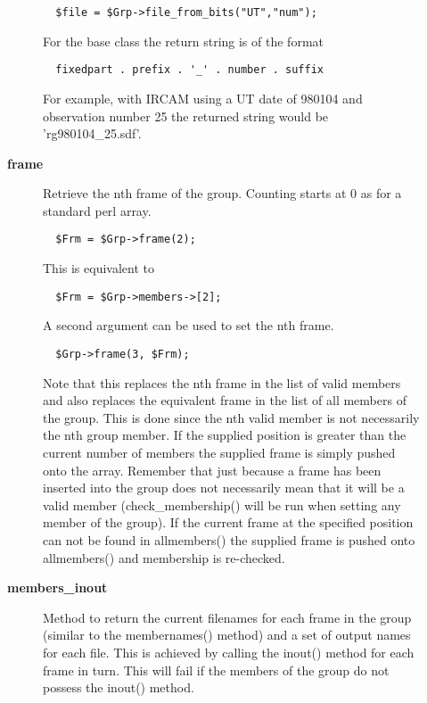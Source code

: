 \begin{description}
\begin{description}
\begin{verbatim}
  $file = $Grp->file_from_bits("UT","num");
\end{verbatim}


For the base class the return string is of the format

\begin{verbatim}
  fixedpart . prefix . '_' . number . suffix
\end{verbatim}


For example, with IRCAM using a UT date of 980104 and observation
number 25 the returned string would be 'rg980104\_25.sdf'.


\item[{\textbf{frame}}] \mbox{}

Retrieve the nth frame of the group.
Counting starts at 0 as for a standard perl array.

\begin{verbatim}
  $Frm = $Grp->frame(2);
\end{verbatim}


This is equivalent to

\begin{verbatim}
  $Frm = $Grp->members->[2];
\end{verbatim}


A second argument can be used to set the nth frame.

\begin{verbatim}
  $Grp->frame(3, $Frm);
\end{verbatim}


Note that this replaces the nth frame in the list of valid members and
also replaces the equivalent frame in the list of all members of the
group. This is done since the nth valid member is not necessarily the
nth group member. If the supplied position is greater than the current
number of members the supplied frame is simply pushed onto the
array. Remember that just because a frame has been inserted into the
group does not necessarily mean that it will be a valid member
(check\_membership() will be run when setting any member of the group).
If the current frame at the specified position can not be found in
allmembers() the supplied frame is pushed onto allmembers() and
membership is re-checked.


\item[{\textbf{members\_inout}}] \mbox{}

Method to return the current filenames for each frame in the
group (similar to the membernames() method) and a set of output
names for each file. This is achieved by calling the inout()
method for each frame in turn. This will fail if the members of the
group do not possess the inout() method.




\end{description}
\end{description}
